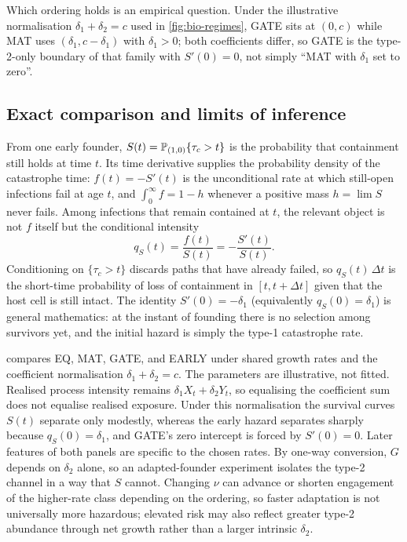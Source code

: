 Which ordering holds is an empirical question. Under the illustrative normalisation $\delta_1+\delta_2=c$ used in \cref{fig:bio-regimes}, GATE sits at $(0,c)$ while MAT uses $(\delta_1,c-\delta_1)$ with $\delta_1>0$; both coefficients differ, so GATE is the type-2-only boundary of that family with $S'(0)=0$, not simply ``MAT with $\delta_1$ set to zero''.

\subsection{Exact comparison and limits of inference}

From one early founder, $S(t)=\mathbb P_{(1,0)}\{\tau_c>t\}$ is the probability that containment still holds at time $t$. Its time derivative supplies the probability density of the catastrophe time: $f(t)=-S'(t)$ is the unconditional rate at which still-open infections fail at age $t$, and $\int_0^\infty f=1-h$ whenever a positive mass $h=\lim S$ never fails. Among infections that remain contained at $t$, the relevant object is not $f$ itself but the conditional intensity
\[
q_S(t)=\frac{f(t)}{S(t)}=-\frac{S'(t)}{S(t)}.
\]
Conditioning on $\{\tau_{\!c}>t\}$ discards paths that have already failed, so $q_S(t)\,\Delta t$ is the short-time probability of loss of containment in $[t,t+\Delta t]$ given that the host cell is still intact. The identity $S'(0)=-\delta_1$ (equivalently $q_S(0)=\delta_1$) is general mathematics: at the instant of founding there is no selection among survivors yet, and the initial hazard is simply the type-1 catastrophe rate.

 compares EQ, MAT, GATE, and EARLY under shared growth rates and the coefficient normalisation $\delta_1+\delta_2=c$. The parameters are illustrative, not fitted. Realised process intensity remains $\delta_1X_t+\delta_2Y_t$, so equalising the coefficient sum does not equalise realised exposure. Under this normalisation the survival curves $S(t)$ separate only modestly, whereas the early hazard separates sharply because $q_S(0)=\delta_1$, and GATE's zero intercept is forced by $S'(0)=0$. Later features of both panels are specific to the chosen rates. By one-way conversion, $G$ depends on $\delta_2$ alone, so an adapted-founder experiment isolates the type-2 channel in a way that $S$ cannot. Changing $\nu$ can advance or shorten engagement of the higher-rate class depending on the ordering, so faster adaptation is not universally more hazardous; elevated risk may also reflect greater type-2 abundance through net growth rather than a larger intrinsic $\delta_2$.

